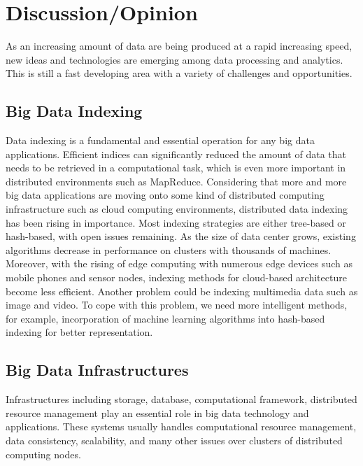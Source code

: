 \documentclass[conference]{IEEEtran}
\begin{document}
\hypertarget{discussionopinion}{%
\section{Discussion/Opinion}\label{discussionopinion}}

As an increasing amount of data are being produced at a rapid increasing
speed, new ideas and technologies are emerging among data processing and
analytics. This is still a fast developing area with a variety of
challenges and opportunities.

\hypertarget{big-data-indexing-1}{%
\subsection{Big Data Indexing}\label{big-data-indexing-1}}

Data indexing is a fundamental and essential operation for any big data
applications. Efficient indices can significantly reduced the amount of
data that needs to be retrieved in a computational task, which is even
more important in distributed environments such as MapReduce.
Considering that more and more big data applications are moving onto
some kind of distributed computing infrastructure such as cloud
computing environments, distributed data indexing has been rising in
importance. Most indexing strategies are either tree-based or
hash-based, with open issues remaining. As the size of data center
grows, existing algorithms decrease in performance on clusters with
thousands of machines. Moreover, with the rising of edge computing with
numerous edge devices such as mobile phones and sensor nodes, indexing
methods for cloud-based architecture become less efficient. Another
problem could be indexing multimedia data such as image and video. To
cope with this problem, we need more intelligent methods, for example,
incorporation of machine learning algorithms into hash-based indexing
for better representation.

\hypertarget{big-data-infrastructures-1}{%
\subsection{Big Data Infrastructures}\label{big-data-infrastructures-1}}

Infrastructures including storage, database, computational framework,
distributed resource management play an essential role in big data
technology and applications. These systems usually handles computational
resource management, data consistency, scalability, and many other
issues over clusters of distributed computing nodes.
\end{document}
